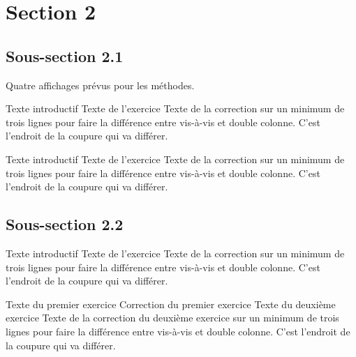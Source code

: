 \section{Section 2}
\subsection{Sous-section 2.1}
Quatre affichages prévus pour les méthodes.

\begin{methode}
    \Papiers[Largeur=10,Hauteur=5,Couleur=Olive]
    
    Texte introductif
    \exercice
    Texte de l’exercice
    \correction
    Texte de la correction sur un minimum de trois lignes pour faire la
    différence entre vis-à-vis et double colonne. C’est l’endroit de la
    coupure qui va différer.
\end{methode}

\begin{methode*1}
    Texte introductif
    \exercice
    Texte de l’exercice
    \correction
    Texte de la correction sur un minimum de trois lignes pour faire la
    différence entre vis-à-vis et double colonne. C’est l’endroit de la
    coupure qui va différer.
\end{methode*1}

\subsection{Sous-section 2.2}
\begin{methode*2}
    Texte introductif
    \exercice
    Texte de l’exercice
    \correction
    Texte de la correction sur un minimum de trois lignes pour faire la
    différence entre vis-à-vis et double colonne. C’est l’endroit de la
    coupure qui va différer.
\end{methode*2}

\begin{methode*2*2}
    \exercice
    \label{methode-exemple}
    Texte du premier exercice
    \correction
    Correction du premier exercice
    \exercice
    Texte du deuxième exercice
    \correction
    Texte de la correction du deuxième exercice sur un minimum de trois
    lignes pour faire la différence entre vis-à-vis et double
    colonne. C’est l’endroit de la coupure qui va différer.
\end{methode*2*2}